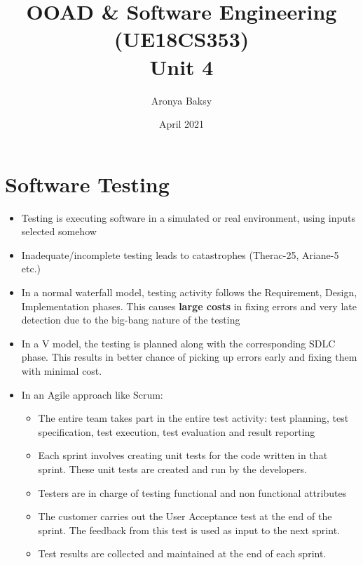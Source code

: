 \documentclass{article}
\title{OOAD \& Software Engineering (UE18CS353) \\
    Unit 4}
\author{Aronya Baksy}
\date{April 2021}
\begin{document}
\maketitle
\section{Software Testing}
\begin{itemize}
    \item Testing is executing software in a simulated or real environment, using inputs selected somehow
    
    \item Inadequate/incomplete testing leads to catastrophes (Therac-25, Ariane-5 etc.)
    
    \item In a normal waterfall model, testing activity follows the Requirement, Design, Implementation phases. This causes \textbf{large costs} in fixing errors and very late detection due to the big-bang nature of the testing
    
    \item In a V model, the testing is planned along with the corresponding SDLC phase. This results in better chance of picking up errors early and fixing them with minimal cost.
    
    \item In an Agile approach like Scrum:
    \begin{itemize}
        \item The entire team takes part in the entire test activity: test planning, test specification, test execution, test evaluation and result reporting 
        
        \item Each sprint involves creating unit tests for the code written in that sprint. These unit tests are created and run by the developers.
        
        \item Testers are in charge of testing functional and non functional attributes
        
        \item The customer carries out the User Acceptance test at the end of the sprint. The feedback from this test is used as input to the next sprint. 
        
        \item Test results are collected and maintained at the end of each sprint.
    \end{itemize}
\end{itemize}
\end{document}
